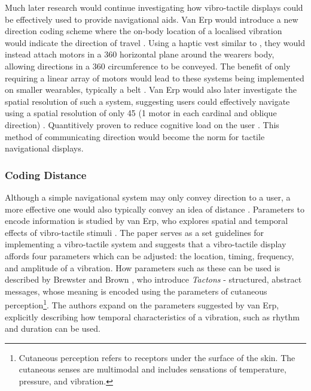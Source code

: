 \documentclass{interim}
\begin{document}
Much later research would continue investigating how vibro-tactile displays could be effectively used to provide navigational aids. Van Erp would introduce a new direction coding scheme where the on-body location of a localised vibration would indicate the direction of travel \cite{van2000tactile}. Using a haptic vest similar to \cite{729547}, they would instead attach motors in a 360\degree{} horizontal plane around the wearers body, allowing directions in a 360\degree{} circumference to be conveyed. The benefit of only requiring a linear array of motors would lead to these systems being implemented on smaller wearables, typically a belt \cite{10.1145/1463160.1463179, tsukada2004activebelt, 10.1145/2449396.2449450}. Van Erp would also later investigate the spatial resolution of such a system, suggesting users could effectively navigate using a spatial resolution of only 45\degree{} (1 motor in each cardinal and oblique direction) \cite{10.1145/1060581.1060585}. Quantitively proven to reduce cognitive load on the user \cite{VANERP2004247}. This method of communicating direction would become the norm for tactile navigational displays.

\subsubsection{Coding Distance}
Although a simple navigational system may only convey direction to a user, a more effective one would also typically convey an idea of distance \cite{burntt2002empirical}. Parameters to encode information is studied by van Erp, who explores spatial and temporal effects of vibro-tactile stimuli \cite{guidelines}. The paper serves as a set guidelines for implementing a vibro-tactile system and suggests that a vibro-tactile display affords four parameters which can be adjusted: the location, timing, frequency, and amplitude of a vibration. How parameters such as these can be used is described by Brewster and Brown \cite{10.5555/976310.976313}, who introduce \textit{Tactons} - structured, abstract messages, whose meaning is encoded using the parameters of cutaneous perception\footnote{Cutaneous perception refers to receptors under the surface of the skin. The cutaneous senses are multimodal and includes sensations of temperature, pressure, and vibration.}. The authors expand on the parameters suggested by van Erp, explicitly describing how temporal characteristics of a vibration, such as rhythm and duration can be used.
\end{document}
